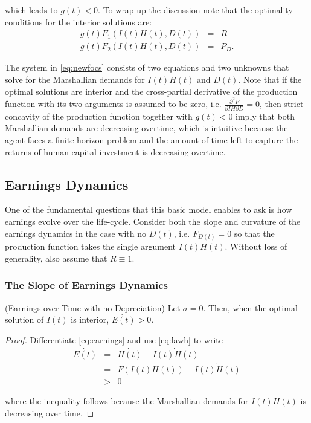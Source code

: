 \noindent which leads to $\dot{g(t)} < 0$. To wrap up the discussion note that the optimality conditions for the interior solutions are:
\begin{eqnarray}
g(t) F_{1}(I(t)H(t),D(t)) &=& R \nonumber \\
g(t) F_{2}(I(t)H(t),D(t)) &=& P_{D} \label{eq:newfocs}. 
\end{eqnarray}

\indent The system in \eqref{eq:newfocs} consists of two equations and two unknowns that solve for the Marshallian demands for $I(t)H(t)$ and $D(t)$. Note that if the optimal solutions are interior and the cross-partial derivative of the production function with its two arguments is assumed to be zero, i.e. $\frac{\partial^2F}{\partial IH \partial D} = 0$, then strict concavity of the production function together with $\dot{g(t)} < 0$ imply that both Marshallian demands are decreasing overtime, which is intuitive because the agent faces a finite horizon problem and the amount of time left to capture the returns of human capital investment is decreasing overtime. 

\subsection{Earnings Dynamics}
\indent One of the fundamental questions that this basic model enables to ask is how earnings evolve over the life-cycle. Consider both the slope and curvature of the earnings dynamics in the case with no $D(t)$, i.e. $F_{D(t)}=0$ so that the production function takes the single argument $I(t)H(t)$. Without loss of generality, also assume that $R\equiv1$.

\subsubsection{The Slope of Earnings Dynamics}

\begin{claim} (Earnings over Time with no Depreciation) \label{claim:earnnodep}
Let $\sigma = 0$. Then, when the optimal solution of $I(t)$ is interior, $\dot{E(t)} > 0$.
\end{claim}

\begin{proof}
Differentiate \eqref{eq:earnings} and use \eqref{eq:lawh} to write
\begin{eqnarray}
\dot{E(t)} &=& \dot{H(t)} - \dot{I(t)H(t)}  \nonumber \\
           &=& F \left( I(t) H(t) \right) - \dot{I(t)H(t)}  \nonumber \\     
           &>& 0 
\end{eqnarray}

\noindent where the inequality follows because the Marshallian demands for $I(t)H(t)$ is decreasing over time.
\end{proof}

